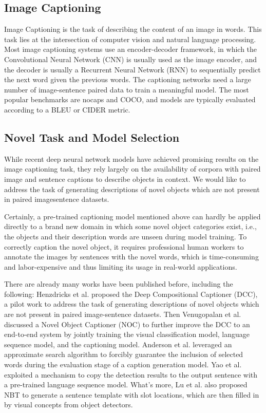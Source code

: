 \documentclass[a4paper, 11pt]{article} %
\begin{document}
\subsection{\textbf{Image Captioning}}

Image Captioning is the task of describing the content of an image in words. This task lies
at the intersection of computer vision and natural language processing. Most image captioning
systems use an encoder-decoder framework, in which the Convolutional Neural Network (CNN)
is usually used as the image encoder, and the decoder is usually a Recurrent Neural Network
(RNN) to sequentially predict the next word given the previous words. The captioning networks
need a large number of image-sentence paired data to train a meaningful model. The most
popular benchmarks are nocaps and COCO, and models are typically evaluated according to a
BLEU or CIDER metric.

\subsection{\textbf{Novel Task and Model Selection}}

While recent deep neural network models have achieved promising results on the image
captioning task, they rely largely on the availability of corpora with paired image and
sentence captions to describe objects in context. We would like to address the task of
generating descriptions of novel objects which are not present in paired imagesentence
datasets.

Certainly, a pre-trained captioning model mentioned above can hardly be applied directly to
a brand new domain in which some novel object categories exist, i.e., the objects and their
description words are unseen during model training. To correctly caption the novel object,
it requires professional human workers to annotate the images by sentences with the novel
words, which is time-consuming and labor-expensive and thus limiting its usage in real-world
applications.

There are already many works have been published before, including the following: Henzdricks
et al. proposed the Deep Compositional Captioner (DCC), a pilot work to address the task
of generating descriptions of novel objects which are not present in paired image-sentence
datasets. Then Venugopalan et al. discussed a Novel Object Captioner (NOC) to further improve
the DCC to an end-to-end system by jointly training the visual classification model, language
sequence model, and the captioning model. Anderson et al. leveraged an approximate search
algorithm to forcibly guarantee the inclusion of selected words during the evaluation stage
of a caption generation model. Yao et al. exploited a mechanism to copy the detection results
to the output sentence with a pre-trained language sequence model. What's more, Lu et al.
also proposed NBT to generate a sentence template with slot locations, which are then filled
in by visual concepts from object detectors.
\end{document}
